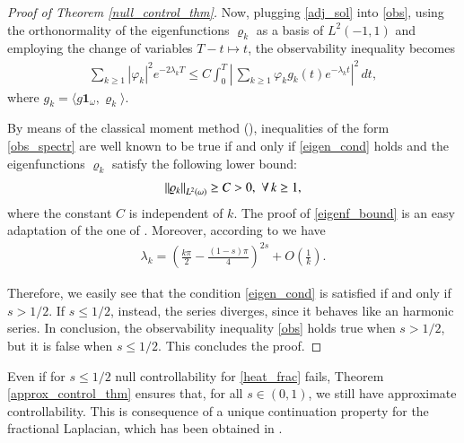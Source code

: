 \begin{proof}[Proof of Theorem \ref{null_control_thm}]
Now, plugging \eqref{adj_sol} into \eqref{obs}, using the orthonormality of the eigenfunctions $\varrho_k$ as a basis of $L^2(-1,1)$ and employing the change of variables $T-t\mapsto t$, the observability inequality becomes 
\begin{align}\label{obs_spectr}
	\sum_{k\geq 1} |\varphi_k|^2e^{-2\lambda_k T} \leq C\int_0^T\left|\,\sum_{k\geq 1} \varphi_kg_k(t)e^{-\lambda_k t}\right|^2\,dt, 
\end{align}
where $g_k = \langle g\mathbf{1}_{\omega},\varrho_k\rangle$. 
	
By means of the classical moment method (\cite{fattorini1971exact}), inequalities of the form \eqref{obs_spectr} are well known to be true if and only if \eqref{eigen_cond} holds and the eigenfunctions $\varrho_k$ satisfy the following lower bound:
\begin{align}\label{eigenf_bound}
	{\left\|\varrho_k\right\|}_{L^2(\omega)}\geq C>0, \,\,\forall \, k\geq 1,
\end{align}
where the constant $C$ is independent of $k$. The proof of \eqref{eigenf_bound} is an easy adaptation of the one of \cite[Lemma 2]{kwasnicki2012eigenvalues}. Moreover, according to \cite{kulczycki2010spectral,kwasnicki2012eigenvalues} we have 
\begin{align*}
	\lambda_k = \left(\frac{k\pi}{2}-\frac{(1-s)\pi}{4}\right)^{2s}+O\left(\frac{1}{k}\right).
\end{align*}
	
Therefore, we easily see that the condition \eqref{eigen_cond} is satisfied if and only if $s>1/2$. If $s\leq 1/2$, instead, the series diverges, since it behaves like an harmonic series. In conclusion, the observability inequality \eqref{obs} holds true when $s>1/2$, but it is false when $s\leq 1/2$. This concludes the proof. 
\end{proof}

Even if for $s\leq 1/2$ null controllability for \eqref{heat_frac} fails, Theorem \ref{approx_control_thm} ensures that, for all $s\in(0,1)$, we still have approximate controllability. This is consequence of a unique continuation property for the fractional Laplacian, which has been obtained in \cite{fall2014unique}.

